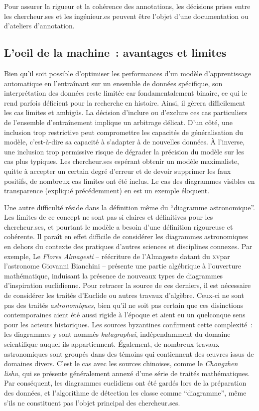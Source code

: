 Pour assurer la rigueur et la cohérence des annotations, les décisions
prises entre les chercheur.ses et les ingénieur.es peuvent être l'objet d'une
documentation ou d'ateliers d'annotation.

\hypertarget{loeil-de-la-machine-avantages-et-limites}{%
\subsection{L'oeil de la machine~: avantages et
limites}\label{loeil-de-la-machine-avantages-et-limites}}

Bien qu'il soit possible d'optimiser les performances d'un modèle
d'apprentissage automatique en l'entraînant sur un ensemble de données
spécifique, son interprétation des données reste limitée car
fondamentalement binaire, ce qui le rend parfois déficient pour la
recherche en histoire. Ainsi, il gèrera difficilement les cas limites et
ambigüs. La décision d'inclure ou d'exclure ces cas particuliers de
l'ensemble d'entraînement implique un arbitrage délicat. D'un côté, une
inclusion trop restrictive peut compromettre les capacités de
généralisation du modèle, c'est-à-dire sa capacité à s'adapter à de
nouvelles données. À l'inverse, une inclusion trop permissive risque de
dégrader la précision du modèle sur les cas plus typiques. Les
chercheur.ses espérant obtenir un modèle maximaliste, quitte à accepter un
certain degré d'erreur et de devoir supprimer les faux
positifs, de nombreux cas limites ont été inclus. Le cas des diagrammes
visibles en transparence (expliqué précédemment) en est un exemple
éloquent.

Une autre difficulté réside dans la définition même du ``diagramme
astronomique''. Les limites de ce concept ne sont pas si claires et
définitives pour les chercheur.ses, et pourtant le modèle a besoin d'une
définition rigoureuse et cohérente. Il paraît en effet difficile de
considérer les diagrammes astronomiques en dehors du contexte des
pratiques d'autres sciences et disciplines connexes. Par exemple, Le
\emph{Flores Almagesti} -- réécriture de l'Almageste datant du \textsc{xv}\ieme par
l'astronome Giovanni Bianchini -- présente une partie algébrique à
l'ouverture mathématique, induisant la présence de nouveaux types de
diagrammes d'inspiration euclidienne. Pour retracer la source de ces
derniers, il est nécessaire de considérer les traités d'Euclide ou
autres travaux d'algèbre. Ceux-ci ne sont pas des traités
\emph{astronomiques}, bien qu'il ne soit pas certain que ces disinctions
contemporaines aient été aussi rigide à l'époque et aient eu un
quelconque sens pour les acteurs historiques. Les sources byzantines
confirment cette complexité~: les diagrammes y sont nommés
\emph{katagraphai}, indépendamment du domaine scientifique auquel ils
appartiennent. Également, de nombreux travaux astronomiques sont groupés
dans des témoins qui contiennent des œuvres issus de domaines divers.
C'est le cas avec les sources chinoises, comme le \emph{Chongzhen
lishu}, qui se présente généralement annexé d'une série de traités
mathématiques. Par conséquent, les diagrammes euclidiens ont été gardés
lors de la préparation des données, et l'algorithme de détection les
classe comme ``diagramme'', même s'ils ne constituent pas l'objet
principal des chercheur.ses.

